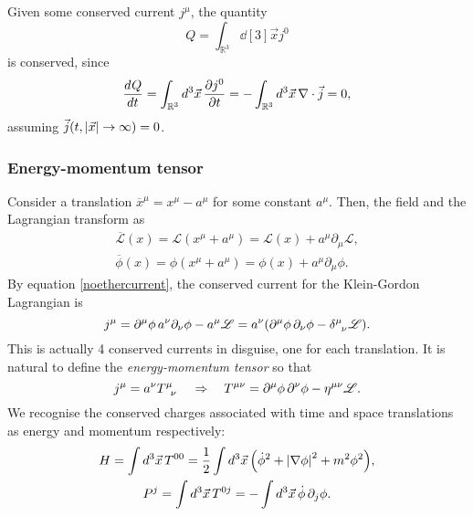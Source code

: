\documentclass{article}
\begin{document}
Given some conserved current $ j^{\mu} $, the quantity
\begin{equation}
	Q = \int_{\mathbb{R}^{3}} \dd[3]{\vec{x}} j^{0}
\end{equation}
is conserved, since
\begin{equation}
	\frac{d^{} Q}{dt^{}} = \int_{\mathbb{R}^{3}} \dd[3]{\vec{x}} \pdv{j^{0}}{t} = -\int_{\mathbb{R}^{3}} \dd[3]{\vec{x}} \nabla \cdot \vec{j} = 0,
\end{equation}
assuming $ \vec{j}(t, \abs{\vec{x}} \to \infty) = 0 $.
\subsubsection{Energy-momentum tensor}
Consider a translation $ \overbar{x}^{\mu} = x^{\mu} - a^{\mu} $ for some constant $ a^{\mu} $. Then, the field and the Lagrangian transform as
\begin{gather}
	\overbar{\mathscr{L}}(x) = \mathscr{L}(x^{\mu} + a^{\mu}) = \mathscr{L}(x) + a^{\mu} \partial_{\mu} \mathscr{L}, \\
	\overbar{\phi}(x) = \phi(x^{\mu} + a^{\mu}) = \phi(x) + a^{\mu} \partial_{\mu} \phi.
\end{gather}
By equation \eqref{noethercurrent}, the conserved current for the Klein-Gordon Lagrangian is
\begin{equation}
	j^{\mu} = \partial^{\mu} \phi \, a^{\nu} \partial_{\nu} \phi - a^{\mu} \mathscr{L} = a^{\nu} \qty(\partial^{\mu} \phi \, \partial_{\nu} \phi - \delta\indices{^{\mu}_{\nu}} \mathscr{L}).
\end{equation}
This is actually 4 conserved currents in disguise, one for each translation. It is natural to define the \textit{energy-momentum tensor} so that
\begin{equation}
	j^{\mu} = a^{\nu} T\indices{^{\mu}_{\nu}} \implies T^{\mu\nu} = \partial^{\mu} \phi \, \partial^{\nu} \phi - \eta^{\mu \nu} \mathscr{L}.
\end{equation}
We recognise the conserved charges associated with time and space translations as energy and momentum respectively:
\begin{gather} \label{hamiltonian1}
	H = \int \dd[3]{\vec{x}} T^{00} = \frac{1}{2}  \int\dd[3]{\vec{x}} \qty(\dot{\phi}^{2} + \abs{\nabla \phi}^2 + m^{2} \phi^{2}), \\
	P^{j} = \int \dd[3]{\vec{x}} T^{0j} = - \int \dd[3]{\vec{x}} \dot{\phi} \, \partial_{j} \phi.
\end{gather}
\end{document}
